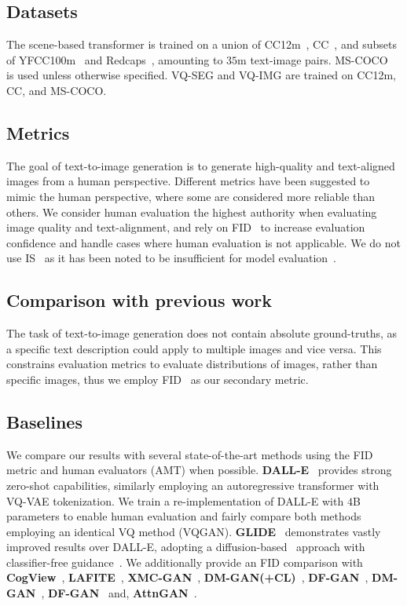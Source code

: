 \documentclass[final]{cvpr}
\begin{document}
\subsection{Datasets} The scene-based transformer is trained on a union of CC12m~\cite{changpinyo2021conceptual}, CC~\cite{sharma2018conceptual}, and subsets of YFCC100m~\cite{thomee2016yfcc100m} and Redcaps~\cite{desai2021redcaps}, amounting to $35$m text-image pairs. MS-COCO~\cite{lin2014microsoft} is used unless otherwise specified. VQ-SEG and VQ-IMG are trained on CC12m, CC, and MS-COCO.

\subsection{Metrics} The goal of text-to-image generation is to generate high-quality and text-aligned images from a human perspective. Different metrics have been suggested to mimic the human perspective, where some are considered more reliable than others. We consider human evaluation the highest authority when evaluating image quality and text-alignment, and rely on FID~\cite{heusel2017gans} to increase evaluation confidence and handle cases where human evaluation is not applicable. We do not use IS~\cite{salimans2016improved} as it has been noted to be insufficient for model evaluation~\cite{barratt2018note}.

\subsection{Comparison with previous work}
\label{sec:prev_work}

The task of text-to-image generation does not contain absolute ground-truths, as a specific text description could apply to multiple images and vice versa. This constrains evaluation metrics to evaluate distributions of images, rather than specific images, thus we employ FID~\cite{heusel2017gans} as our secondary metric. 

\subsection{Baselines} We compare our results with several state-of-the-art methods using the FID metric and human evaluators (AMT) when possible. \textbf{DALL-E}~\cite{ramesh2021zero} provides strong zero-shot capabilities, similarly employing an autoregressive transformer with VQ-VAE tokenization. We train a re-implementation of DALL-E with $4$B parameters to enable human evaluation and fairly compare both methods employing an identical VQ method (VQGAN). \textbf{GLIDE}~\cite{nichol2021glide} demonstrates vastly improved results over DALL-E, adopting a diffusion-based~\cite{sohl2015deep} approach with classifier-free guidance~\cite{ho2021classifier}. We additionally provide an FID comparison with \textbf{CogView}~\cite{ding2021cogview}, \textbf{LAFITE}~\cite{zhou2021lafite}, \textbf{XMC-GAN}~\cite{zhang2021cross}, \textbf{DM-GAN(+CL)}~\cite{ye2021improving}, \textbf{DF-GAN}~\cite{tao2020df}, \textbf{DM-GAN}~\cite{zhu2019dm}, \textbf{DF-GAN}~\cite{tao2020df} and, \textbf{AttnGAN}~\cite{xu2018attngan}.
\end{document}
